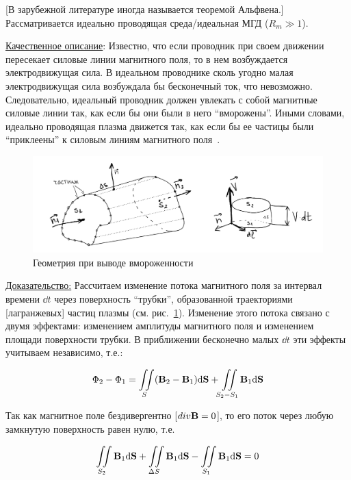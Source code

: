 \documentclass[10pt, a4paper]{article}
\begin{document}
[В зарубежной литературе иногда называется теоремой Альфвена.] Рассматривается идеально проводящая среда/идеальная МГД ($R_m \gg 1$). 

\uline{Качественное описание}: Известно, что если проводник при своем движении пересекает силовые линии магнитного поля, то в нем возбуждается электродвижущая сила. В идеальном проводнике сколь угодно малая электродвижущая сила возбуждала бы бесконечный ток, что невозможно. Следовательно, идеальный проводник должен увлекать с собой магнитные силовые линии так, как если бы они были в него ``вморожены''. Иными словами, идеально проводящая плазма движется так, как если бы ее частицы были ``приклеены'' к силовым линиям магнитного поля~\cite{frank}.

\begin{figure}[ht]
    \begin{center}
    	\includegraphics[width=1\linewidth]{5.flow.pdf}
   \end{center}	
    \caption{Геометрия при выводе вмороженности}
    \label{fig:Alfven_th_geom}
\end{figure}

\uline{Доказательство:} Рассчитаем изменение потока магнитного поля за интервал времени $\dd t$ через поверхность ``трубки'', образованной траекториями [лагранжевых] частиц плазмы (см. рис.~\ref{fig:Alfven_th_geom}). Изменение этого потока связано с двумя эффектами: изменением амплитуды магнитного поля и изменением площади поверхности трубки. В приближении бесконечно малых $\dd t$ эти эффекты учитываем независимо, т.е.:

\begin{equation} \label{eq:frozen_in_flow_diff}
	\Phi_2 - \Phi_1 = \iint\limits_S (\vb{B}_2 - \vb{B}_1)\dd \vb{S} + \iint\limits_{S_2 - S_1}\vb{B}_1\dd\vb{S}
\end{equation}

Так как магнитное поле бездивергентно [$div\vb{B}=0$], то его поток через любую замкнутую поверхность равен нулю, т.е.

\begin{equation*}
	\iint\limits_{S_2}\vb{B}_1\dd\vb{S} + \iint\limits_{\Delta S}\vb{B}_1\dd\vb{S} - \iint\limits_{S_1}\vb{B}_1\dd\vb{S} = 0
\end{equation*}
\end{document}

